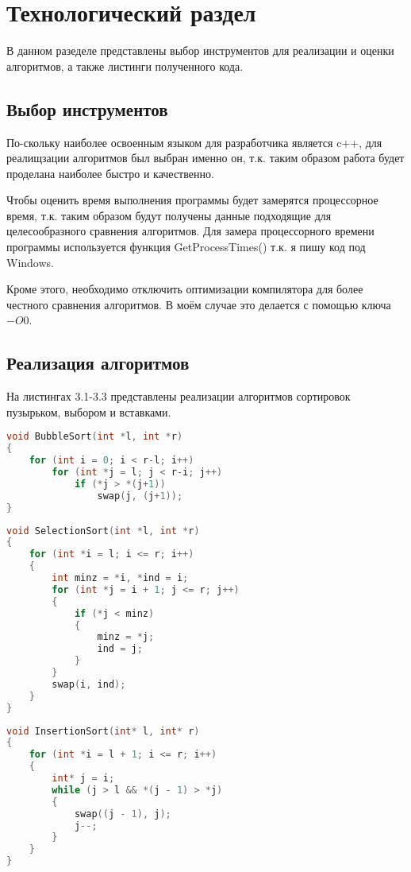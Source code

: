 \chapter{Технологический раздел}
В данном разеделе представлены выбор инструментов для реализации и оценки алгоритмов, а также листинги полученного кода.
\section{Выбор инструментов}
По-скольку наиболее освоенным языком для разработчика является c++, для реалищзации алгоритмов был выбран именно он, т.к. таким образом работа будет проделана наиболее быстро и качественно.

Чтобы оценить время выполнения программы будет замерятся процессорное время, т.к. таким образом будут получены данные подходящие для целесообразного сравнения алгоритмов. Для замера процессорного времени программы используется функция GetProcessTimes() т.к. я пишу код под Windows. \cite{get_proccess_times}

Кроме этого, необходимо отключить оптимизации компилятора для более честного сравнения алгоритмов. В моём случае это делается с помощью ключа $-O0$. \cite{optimization}

\section{Реализация алгоритмов}
На листингах 3.1-3.3 представлены реализации алгоритмов сортировок пузырьком, выбором и вставками.

\begin{lstlisting}[language=c++, caption=Реализация алгоритма сортировки пузырьком]
void BubbleSort(int *l, int *r)
{
	for (int i = 0; i < r-l; i++)
		for (int *j = l; j < r-i; j++)
			if (*j > *(j+1))
				swap(j, (j+1));
}
\end{lstlisting}

\begin{lstlisting}[language=c++, caption=Реализация алгоритма сортировки выбором]
void SelectionSort(int *l, int *r)
{
	for (int *i = l; i <= r; i++)
	{
		int minz = *i, *ind = i;
		for (int *j = i + 1; j <= r; j++)
		{
			if (*j < minz)
			{
				minz = *j;
				ind = j;
			}
		}
		swap(i, ind);
	}
}
\end{lstlisting}

\begin{lstlisting}[language=c++, caption=Реализация алгоритма сортировки вставками]
void InsertionSort(int* l, int* r)
{
	for (int *i = l + 1; i <= r; i++)
	{
		int* j = i;
		while (j > l && *(j - 1) > *j)
		{
			swap((j - 1), j);
			j--;
		}
	}
}
\end{lstlisting}